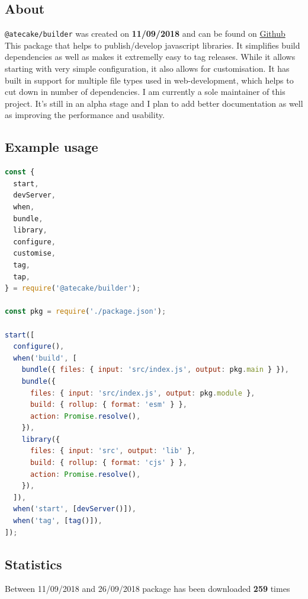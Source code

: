 \documentclass{article}
\begin{document}
\subsection{About}

\begin{flushleft}
\texttt{@atecake/builder} was created on \textbf{11/09/2018} and can be found on \href{https://github.com/WhoAteDaCake/builder}{Github} \\
This package that helps to publish/develop javascript libraries. It simplifies build dependencies as well as makes it extremelly easy to tag releases. While it allows starting with very simple configuration, it also allows for customisation. It has built in support for multiple file types used in web-development, which helps to cut down in number of dependencies. I am currently a sole maintainer of this project. It's still in an alpha stage and I plan to add better documentation as well as improving the performance and usability.
\end{flushleft}

\subsection{Example usage}
\begin{lstlisting}[language=Javascript]
const {
  start,
  devServer,
  when,
  bundle,
  library,
  configure,
  customise,
  tag,
  tap,
} = require('@atecake/builder');

const pkg = require('./package.json');

start([
  configure(),
  when('build', [
    bundle({ files: { input: 'src/index.js', output: pkg.main } }),
    bundle({
      files: { input: 'src/index.js', output: pkg.module },
      build: { rollup: { format: 'esm' } },
      action: Promise.resolve(),
    }),
    library({
      files: { input: 'src', output: 'lib' },
      build: { rollup: { format: 'cjs' } },
      action: Promise.resolve(),
    }),
  ]),
  when('start', [devServer()]),
  when('tag', [tag()]),
]);
\end{lstlisting}

\pagebreak

\subsection{Statistics}
\begin{flushleft}
Between 11/09/2018 and 26/09/2018 package has been downloaded \textbf{259} times
\end{flushleft}
\end{document}
